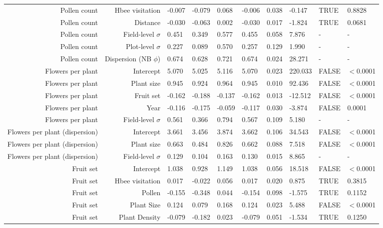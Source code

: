 \begin{landscape}
\begin{longtable}{|r|r|l|l|l|l|l|l|l|l|}
  Pollen count & Hbee visitation & -0.007 & -0.079 & 0.068 & -0.006 & 0.038 & -0.147 & TRUE & 0.8828 \\ 
  Pollen count & Distance & -0.030 & -0.063 & 0.002 & -0.030 & 0.017 & -1.824 & TRUE & 0.0681 \\ 
  Pollen count & Field-level $\sigma$ & 0.451 & 0.349 & 0.577 & 0.455 & 0.058 & 7.876 & - & - \\ 
  Pollen count & Plot-level $\sigma$ & 0.227 & 0.089 & 0.570 & 0.257 & 0.129 & 1.990 & - & - \\ 
  Pollen count & Dispersion (NB $\phi$) & 0.674 & 0.628 & 0.721 & 0.674 & 0.024 & 28.271 & - & - \\ 
  \hline %
  Flowers per plant & Intercept & 5.070 & 5.025 & 5.116 & 5.070 & 0.023 & 220.033 & FALSE & $<$0.0001 \\ 
  Flowers per plant & Plant size & 0.945 & 0.924 & 0.964 & 0.945 & 0.010 & 92.436 & FALSE & $<$0.0001 \\ 
  Flowers per plant & Fruit set & -0.162 & -0.188 & -0.137 & -0.162 & 0.013 & -12.512 & FALSE & $<$0.0001 \\ 
  Flowers per plant & Year & -0.116 & -0.175 & -0.059 & -0.117 & 0.030 & -3.874 & FALSE & 0.0001 \\ 
  Flowers per plant & Field-level $\sigma$ & 0.561 & 0.366 & 0.794 & 0.567 & 0.109 & 5.180 & - & - \\ 
  Flowers per plant (dispersion) & Intercept & 3.661 & 3.456 & 3.874 & 3.662 & 0.106 & 34.543 & FALSE & $<$0.0001 \\ 
  Flowers per plant (dispersion) & Plant size & 0.663 & 0.484 & 0.826 & 0.662 & 0.088 & 7.518 & FALSE & $<$0.0001 \\
  Flowers per plant (dispersion) & Field-level $\sigma$ & 0.129 & 0.104 & 0.163 & 0.130 & 0.015 & 8.865 & - & - \\ 
  \hline %
  Fruit set & Intercept & 1.038 & 0.928 & 1.149 & 1.038 & 0.056 & 18.518 & FALSE & $<$0.0001 \\ 
  Fruit set & Hbee visitation & 0.017 & -0.022 & 0.056 & 0.017 & 0.020 & 0.875 & TRUE & 0.3815 \\ 
  Fruit set & Pollen & -0.155 & -0.348 & 0.044 & -0.154 & 0.098 & -1.575 & TRUE & 0.1152 \\ 
  Fruit set & Plant Size & 0.124 & 0.079 & 0.168 & 0.124 & 0.023 & 5.488 & FALSE & $<$0.0001 \\ 
  Fruit set & Plant Density & -0.079 & -0.182 & 0.023 & -0.079 & 0.051 & -1.534 & TRUE & 0.1250 \\ 

\end{longtable}
\end{landscape}

